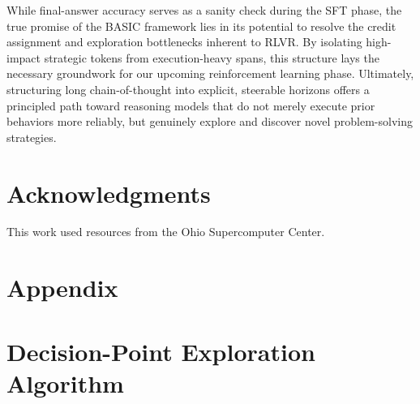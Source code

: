\documentclass[10pt,twocolumn]{article}
\begin{document}
While final-answer accuracy serves as a sanity check during the SFT phase, the true
promise of the BASIC framework lies in its potential to
resolve the credit assignment and exploration bottlenecks inherent to RLVR. By
isolating high-impact strategic tokens from execution-heavy spans, this structure lays
the necessary groundwork for our upcoming reinforcement learning phase. Ultimately,
structuring long chain-of-thought into explicit, steerable horizons offers a principled
path toward reasoning models that do not merely execute prior behaviors more reliably,
but genuinely explore and discover novel problem-solving strategies.

\section*{Acknowledgments}
This work used resources from the Ohio Supercomputer Center.

\clearpage



\clearpage
\appendix
\section*{Appendix}
\section{Decision-Point Exploration Algorithm}
\label{app:decision-point-exploration-algorithm}
\end{document}
